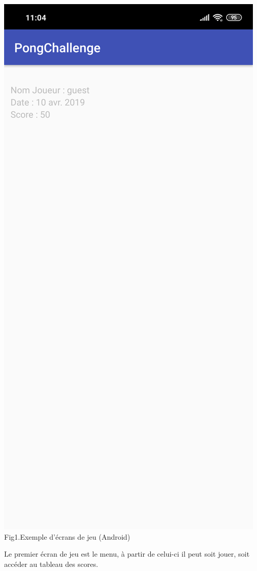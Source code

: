 \documentclass{article}
\begin{document}
\begin{center}
  \includegraphics[scale=0.08]{ScreenScho.png}\\
    \caption{Fig1.Exemple d'écrans de jeu (Android)}
\end{center}
Le premier écran de jeu est le menu, à partir de celui-ci il peut soit jouer, soit accéder au tableau des scores. 
\end{document}
